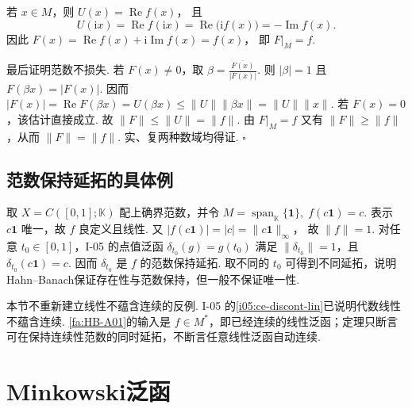 \begin{FAProof}
若 \(\displaystyle x\in M\)，则 \(\displaystyle U(x)=\operatorname{Re}f(x)\)，
且
\[
U(\mathrm{i}x)
=\operatorname{Re}f(\mathrm{i}x)
=\operatorname{Re}\bigl(\mathrm{i}f(x)\bigr)
=-\operatorname{Im}f(x).
\]
因此 \(\displaystyle F(x) =\operatorname{Re}f(x)+\mathrm{i}\operatorname{Im}f(x) =f(x)\)，
即 \(\displaystyle F|_M=f\).

最后证明范数不损失. 若 \(\displaystyle F(x)\neq0\)，取 \(\displaystyle \beta =\frac{\overline{F(x)}}{|F(x)|}\).
则 \(\displaystyle |\beta|=1\) 且 \(\displaystyle F(\beta x)=|F(x)|\). 因而 \(\displaystyle |F(x)| =\operatorname{Re}F(\beta x) =U(\beta x) \leqslant\|U\|\|\beta x\| =\|U\|\|x\|\).
若 \(\displaystyle F(x)=0\)，该估计直接成立. 故 \(\displaystyle \|F\|\leqslant\|U\|=\|f\|\). 由 \(\displaystyle F|_M=f\) 又有 \(\displaystyle \|F\|\geqslant\|f\|\)，从而 \(\displaystyle \|F\|=\|f\|\). 实、复两种数域均得证.
\hfill\(\square\)
\end{FAProof}


\newpage
\subsection{范数保持延拓的具体例}

\begin{FAExample}[常数子空间的延拓]\label{i06:hb-cont-example}
取 \(\displaystyle X=C([0,1];\mathbb K)\) 配上确界范数，并令 \(\displaystyle M=\operatorname{span}_{\mathbb K}\{\mathbf1\}, \; f(c\mathbf1)=c\).
表示 \(\displaystyle c\mathbf1\) 唯一，故 \(\displaystyle f\) 良定义且线性. 又 \(\displaystyle |f(c\mathbf1)|=|c|=\|c\mathbf1\|_\infty\)，
故 \(\displaystyle \|f\|=1\). 对任意 \(\displaystyle t_0\in[0,1]\)，I-05 的点值泛函 \(\displaystyle \delta_{t_0}(g)=g(t_0)\) 满足 \(\displaystyle \|\delta_{t_0}\|=1\)，且 \(\displaystyle \delta_{t_0}(c\mathbf1)=c\). 因而 \(\displaystyle \delta_{t_0}\) 是 \(\displaystyle f\) 的范数保持延拓. 取不同的 \(\displaystyle t_0\) 可得到不同延拓，说明Hahn--Banach保证存在性与范数保持，但一般不保证唯一性.
\end{FAExample}

\begin{FARemark}[线性不蕴含连续的边界]
本节不重新建立线性不蕴含连续的反例. I-05 的\autoref{i05:ce-discont-lin}已说明代数线性不蕴含连续. \autoref{fa:HB-A01}的输入是 \(\displaystyle f\in M^*\)，即已经连续的线性泛函；定理只断言可在保持连续性范数的同时延拓，不断言任意线性泛函自动连续.
\end{FARemark}

\section{Minkowski泛函}\label{sec:i06-minkowski}

